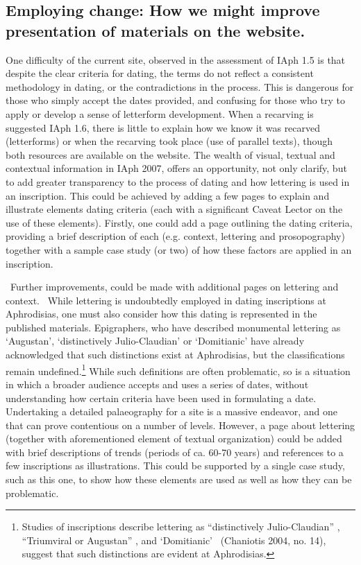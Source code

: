 \documentclass[amsthm,ebook]{saparticle}
\begin{document}
\subsection{Employing change: How we might improve presentation of materials on the website.}
\noindent One difficulty of the current site, observed in the assessment of IAph 1.5 is that despite the clear criteria for
dating, the terms do not reflect a consistent methodology in dating, or the contradictions in the process. This is
dangerous for those who simply accept the dates provided, and confusing for those who try to apply or develop a sense
of letterform development. When a recarving is suggested IAph 1.6, there is little to explain how we know it was
recarved (letterforms) or when the recarving took place (use of parallel texts), though both resources are available on
the website. The wealth of visual, textual and contextual information in IAph 2007, offers an opportunity, not only
clarify, but to add greater transparency to the process of dating and how lettering is used in an inscription. This
could be achieved by adding a few pages to explain and illustrate elements dating criteria (each with a significant
Caveat Lector on the use of these elements). Firstly, one could add a page outlining the dating criteria, providing a
brief description of each (e.g. context, lettering and prosopography) together with a sample case study (or two) of how
these factors are applied in an inscription. 




\ Further improvements, could be made with additional pages on lettering and context. \ While lettering is undoubtedly
employed in dating inscriptions at Aphrodisias, one must also consider how this dating is represented in the published
materials. Epigraphers, who have described monumental lettering as `Augustan', `distinctively Julio-Claudian' or
`Domitianic' have already acknowledged that such distinctions exist at Aphrodisias, but the classifications remain
undefined.\footnote{ Studies of inscriptions describe lettering as ``distinctively Julio-Claudian'' \citep[nos.
2\&3) 317-318]{reynolds1981}, ``Triumviral or Augustan'' \citep[docs. 35-37, 159-163]{reynolds1982}, and ‘Domitianic’ \ (Chaniotis 2004, no.
14), suggest that such distinctions are evident at Aphrodisias.} While such definitions are often problematic, so is
a situation in which a broader audience accepts and uses a series of dates, without understanding how certain criteria
have been used in formulating a date. Undertaking a detailed palaeography for a site is a massive endeavor, and one
that can prove contentious on a number of levels. However, a page about lettering (together with aforementioned element
of textual organization) could be added with brief descriptions of trends (periods of ca. 60-70 years) and references
to a few inscriptions as illustrations. This could be supported by a single case study, such as this one, to show how
these elements are used as well as how they can be problematic.
\end{document}
